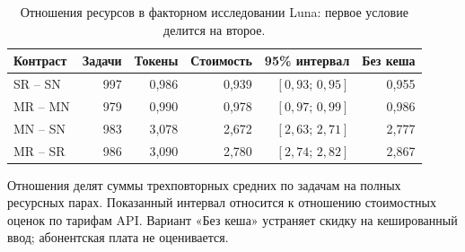 \begin{table}[H]\centering
\caption{Отношения ресурсов в факторном исследовании Luna: первое условие делится на второе.}
\label{tab:scale-resources}
\begin{tabular}{lrrrrr}\toprule
Контраст & Задачи & Токены & Стоимость & 95\% интервал & Без кеша\\\midrule
SR -- SN & 997 & 0,986 & 0,939 & $[0{,}93;\,0{,}95]$ & 0,955\\
MR -- MN & 979 & 0,990 & 0,978 & $[0{,}97;\,0{,}99]$ & 0,986\\
MN -- SN & 983 & 3,078 & 2,672 & $[2{,}63;\,2{,}71]$ & 2,777\\
MR -- SR & 986 & 3,090 & 2,780 & $[2{,}74;\,2{,}82]$ & 2,867\\
\bottomrule\end{tabular}
\par\smallskip\noindent Отношения делят суммы трехповторных средних по задачам на полных ресурсных парах. Показанный интервал относится к отношению стоимостных оценок по тарифам API. Вариант «Без кеша» устраняет скидку на кешированный ввод; абонентская плата не оценивается.
\end{table}
